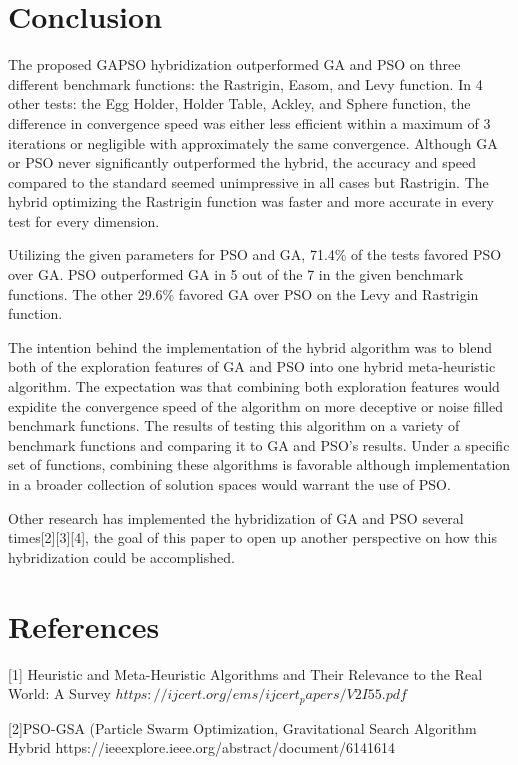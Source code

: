 \documentclass[twocolumn]{article}
\begin{document}
\section{Conclusion}

	    The proposed GAPSO hybridization outperformed GA and PSO on three different benchmark functions: the Rastrigin, Easom, and Levy function. In 4 other tests: the Egg Holder, Holder Table, Ackley, and Sphere function, the difference in convergence speed was either less efficient within a maximum of 3 iterations or negligible with approximately the same convergence.  Although GA or PSO never significantly outperformed the hybrid, the accuracy and speed compared to the standard seemed unimpressive in all cases but Rastrigin. The hybrid optimizing the Rastrigin function was faster and more accurate in every test for every dimension.

Utilizing the given parameters for PSO and GA, 71.4\% of the tests favored PSO over GA. PSO outperformed GA in 5 out of the 7 in the given benchmark functions. The other 29.6\% favored GA over PSO on the Levy and Rastrigin function.

The intention behind the implementation of the hybrid algorithm was to blend both of the exploration features of GA and PSO into one hybrid meta-heuristic algorithm. The expectation was that combining both exploration features would expidite the convergence speed of the algorithm on more deceptive or noise filled benchmark functions. The results of testing this algorithm on a variety of benchmark functions and comparing it to GA and PSO's results. Under a specific set of functions, combining these algorithms is favorable although implementation in a broader collection of solution spaces would warrant the use of PSO.

Other research has implemented the hybridization of GA and PSO several times[2][3][4], the goal of this paper to open up another perspective on how this hybridization could be accomplished.

\section{References}

[1] Heuristic and Meta-Heuristic Algorithms and Their Relevance to the Real World: A Survey
$https://ijcert.org/ems/ijcert_papers/V2I55.pdf$


[2]PSO-GSA (Particle Swarm Optimization, Gravitational Search Algorithm Hybrid
https://ieeexplore.ieee.org/abstract/document/6141614
\end{document}
